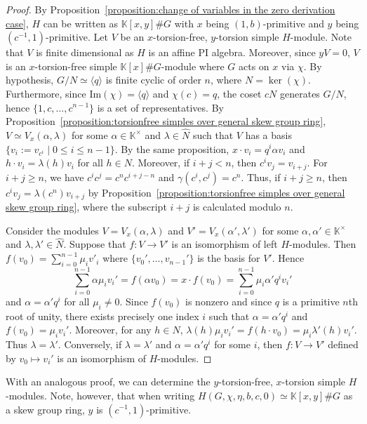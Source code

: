 \documentclass[11pt, twoside]{amsart}
\theoremstyle{definition}
\newcommand{\KK}{\mathbb{K}}
\begin{document}
\begin{proof}
    By Proposition~\ref{proposition:change of variables in the zero derivation case}, $H$ can be written as $\KK[x,y]\# G$ with $x$ being $(1, b)$-primitive and $y$ being $(c^{-1}, 1)$-primitive. Let $V$ be an $x$-torsion-free, $y$-torsion simple $H$-module. Note that $V$ is finite dimensional as $H$ is an affine PI algebra. Moreover, since $yV = 0$, $V$ is an $x$-torsion-free simple $\KK[x]\# G$-module where $G$ acts on $x$ via $\chi$. By hypothesis, $G/N \simeq \langle q\rangle$ is finite cyclic of order $n$, where $N = \ker(\chi)$. Furthermore, since $\mathrm{Im}(\chi)=\langle q\rangle$ and $\chi(c)=q$, the coset $cN$ generates $G/N$, hence $\{1,c,\ldots,c^{n-1}\}$ is a set of representatives. By Proposition~\ref{proposition:torsionfree simples over general skew group ring}, $V \simeq V_x (\alpha, \lambda)$ for some $\alpha \in \KK^\times$ and $\lambda \in \widehat{N}$ such that $V$ has a basis $\{v_i := v_{c^i} \mid 0 \leq i \leq n-1\}$. By the same proposition, $x\cdot v_i = q^i \alpha v_i$ and $h\cdot v_i = \lambda(h)v_i$ for all $h \in N$. Moreover, if $i+j < n$, then $c^i v_j = v_{i+j}$. For $i + j \geq n$, we have $c^i c^j = c^n c^{i+j-n}$ and $\gamma(c^i, c^j) = c^n$. Thus, if $i + j \geq n$, then $c^i v_j = \lambda(c^n)v_{i+j}$ by Proposition~\ref{proposition:torsionfree simples over general skew group ring}, where the subscript $i + j$ is calculated modulo $n$. 

    Consider the modules $V = V_x (\alpha, \lambda)$ and $V' = V_x (\alpha', \lambda')$ for some $\alpha, \alpha' \in \KK^\times$ and $\lambda, \lambda' \in \widehat{N}$. Suppose that $f:V \to V'$ is an isomorphism of left $H$-modules. Then $f(v_0) = \sum_{i=0}^{n-1}\mu_i v'_{i}$ where $\{v_{0}', \ldots, v_{n-1}'\}$ is the basis for $V'$. Hence
    \[\sum_{i=0}^{n-1}\alpha\mu_i v_{i}' = f(\alpha v_0) = x\cdot f(v_0) = \sum_{i=0}^{n-1}\mu_i \alpha' q^i v_{i}'\]
    and $\alpha = \alpha' q^i$ for all $\mu_i \neq 0$. Since $f(v_0)$ is nonzero and since $q$ is a primitive $n$th root of unity, there exists precisely one index $i$ such that $\alpha = \alpha' q^i$ and $f(v_0) = \mu_i v_{i}'$. Moreover, for any $h \in N$, $\lambda(h)\mu_i v_{i}' = f(h\cdot v_0) = \mu_i \lambda'(h)v_{i}'$. Thus $\lambda = \lambda'$. Conversely, if $\lambda = \lambda'$ and $\alpha = \alpha' q^i$ for some $i$, then $f:V \to V'$ defined by $v_0 \mapsto v_{i}'$ is an isomorphism of $H$-modules.
\end{proof}
%
With an analogous proof, we can determine the $y$-torsion-free, $x$-torsion simple $H$-modules. Note, however, that when writing $H(G, \chi, \eta, b, c, 0) \simeq \KK[x,y]\# G$ as a skew group ring, $y$ is $(c^{-1}, 1)$-primitive.
\end{document}
